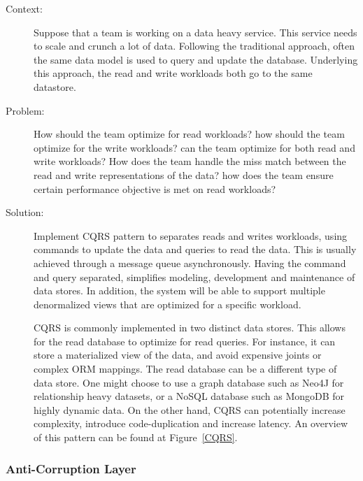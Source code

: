 \documentclass{bmcart}
\begin{document}
\begin{description}
  \item[Context:] Suppose that a team is working on a data heavy service. This service needs to scale and crunch a lot of data. Following the traditional approach, often the same data model is used to query and update the database. Underlying this approach, the read and write workloads both go to the same datastore. 
  \item[Problem:] How should the team optimize for read workloads? how should the team optimize for the write workloads? can the team optimize for both read and write workloads? How does the team handle the miss match between the read and write representations of the data? how does the team ensure certain performance objective is met on read workloads?
  \item[Solution:] Implement CQRS pattern to separates reads and writes workloads, using commands to update the data and queries to read the data. This is usually achieved through a message queue asynchronously. Having the command and query separated, simplifies modeling, development and maintenance of data stores. In addition, the system will be able to support multiple denormalized views that are optimized for a specific workload. 

  CQRS is commonly implemented in two distinct data stores. This allows for the read database to optimize for read queries. For instance, it can store a materialized view of the data, and avoid expensive joints or complex ORM mappings. The read database can be a different type of data store. One might choose to use a graph database such as Neo4J for relationship heavy datasets, or a NoSQL database such as MongoDB for highly dynamic data. On the other hand, CQRS can potentially increase complexity, introduce code-duplication and increase latency. An overview of this pattern can be found at Figure~\ref{CQRS}.   
\end{description}


\subsubsection{Anti-Corruption Layer}
\end{document}
